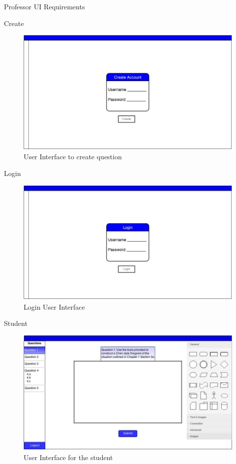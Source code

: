 \documentclass{article}
\begin{document}
\begin{section}{Professor UI Requirements}
\begin{subsection}{Create}
\begin{figure}[h!]
        \centerline{\includegraphics[width=17cm]{UICreate.jpg}}
        \caption{User Interface to create question}
\end{figure}
\end{subsection}
\newpage
\begin{subsection}{Login}
\begin{figure}[h!]
        \centerline{\includegraphics[width=17cm]{UILogin.jpg}}
        \caption{Login User Interface}
\end{figure}
\end{subsection}
\newpage
\begin{subsection}{Student}
\begin{figure}[h!]
        \centerline{\includegraphics[width=17cm]{uistudent.jpg}}
        \caption{User Interface for the student}
\end{figure}
\end{subsection}


\end{section}
\end{document}
